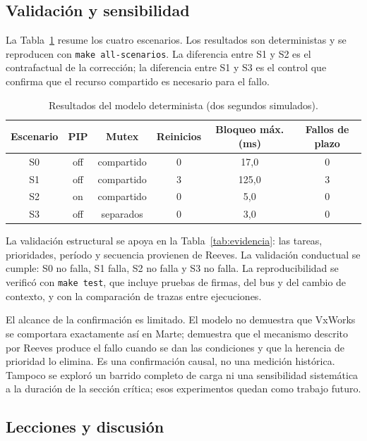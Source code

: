 \documentclass[journal]{IEEEtran}
\begin{document}
\subsection{Validación y sensibilidad}
\label{sec:validacion}

La Tabla~\ref{tab:resultados} resume los cuatro escenarios. Los resultados son deterministas y se reproducen con \texttt{make all-scenarios}. La diferencia entre S1 y S2 es el contrafactual de la corrección; la diferencia entre S1 y S3 es el control que confirma que el recurso compartido es necesario para el fallo.

\begin{table}[t]
\caption{Resultados del modelo determinista (dos segundos simulados).}
\label{tab:resultados}
\centering
\footnotesize
\begin{tabular}{c c c c c c}
\toprule
\textbf{Escenario} & \textbf{PIP} & \textbf{Mutex} & \textbf{Reinicios} & \textbf{Bloqueo máx. (ms)} & \textbf{Fallos de plazo} \\
\midrule
S0 & off & compartido & 0 & 17,0 & 0 \\
S1 & off & compartido & 3 & 125,0 & 3 \\
S2 & on & compartido & 0 & 5,0 & 0 \\
S3 & off & separados & 0 & 3,0 & 0 \\
\bottomrule
\end{tabular}
\end{table}

La validación estructural se apoya en la Tabla~\ref{tab:evidencia}: las tareas, prioridades, período y secuencia provienen de Reeves. La validación conductual se cumple: S0 no falla, S1 falla, S2 no falla y S3 no falla. La reproducibilidad se verificó con \texttt{make test}, que incluye pruebas de firmas, del bus y del cambio de contexto, y con la comparación de trazas entre ejecuciones.

El alcance de la confirmación es limitado. El modelo no demuestra que VxWorks se comportara exactamente así en Marte; demuestra que el mecanismo descrito por Reeves produce el fallo cuando se dan las condiciones y que la herencia de prioridad lo elimina. Es una confirmación causal, no una medición histórica. Tampoco se exploró un barrido completo de carga ni una sensibilidad sistemática a la duración de la sección crítica; esos experimentos quedan como trabajo futuro.

\subsection{Lecciones y discusión}
\label{sec:lecciones}
\end{document}
